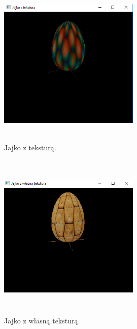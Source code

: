 \documentclass[polish,polish,a4paper]{article}
\begin{document}
        \begin{figure}[h!]
      \centering
      \includegraphics[width=0.6\textwidth,height=8cm]{jajkoztekstura.png}
      \caption{Jajko z teksturą.}
      \label{fig:zrzut1}
    \end{figure}
    
            \begin{figure}[h!]
      \centering
      \includegraphics[width=0.6\textwidth,height=8cm]{jajkozwlasnatekstura.png}
      \caption{Jajko z własną teksturą.}
      \label{fig:zrzut1}
    \end{figure}
\end{document}
